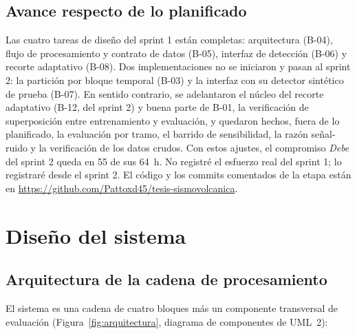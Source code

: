 \documentclass[12pt,oneside,spanish,oldfontcommands]{memoir}
\begin{document}
\section{Avance respecto de lo planificado}
\label{sec:avance}

Las cuatro tareas de diseño del sprint 1 están completas: arquitectura (B-04),
flujo de procesamiento y contrato de datos (B-05), interfaz de detección
(B-06) y recorte adaptativo (B-08). Dos implementaciones no se iniciaron y
pasan al sprint 2: la partición por bloque temporal (B-03) y la interfaz con su
detector sintético de prueba (B-07). En sentido contrario, se adelantaron el
núcleo del recorte adaptativo (B-12, del sprint 2) y buena parte de B-01, la
verificación de superposición entre entrenamiento y evaluación, y quedaron
hechos, fuera de lo planificado, la evaluación por tramo, el barrido de
sensibilidad, la razón señal-ruido y la verificación de los datos crudos. Con estos ajustes, el compromiso
\emph{Debe} del sprint 2 queda en 55 de sus 64~h. No registré el esfuerzo
real del sprint 1; lo registraré desde el sprint 2. El código y los commits
comentados de la etapa están en
\url{https://github.com/Pattoxd45/tesis-sismovolcanica}.

\chapter{Diseño del sistema}
\label{cap:diseno}

\section{Arquitectura de la cadena de procesamiento}
\label{sec:arquitectura-cadena}

El sistema es una cadena de cuatro bloques más un componente transversal de
evaluación (Figura~\ref{fig:arquitectura}, diagrama de componentes de UML~2):
\end{document}
